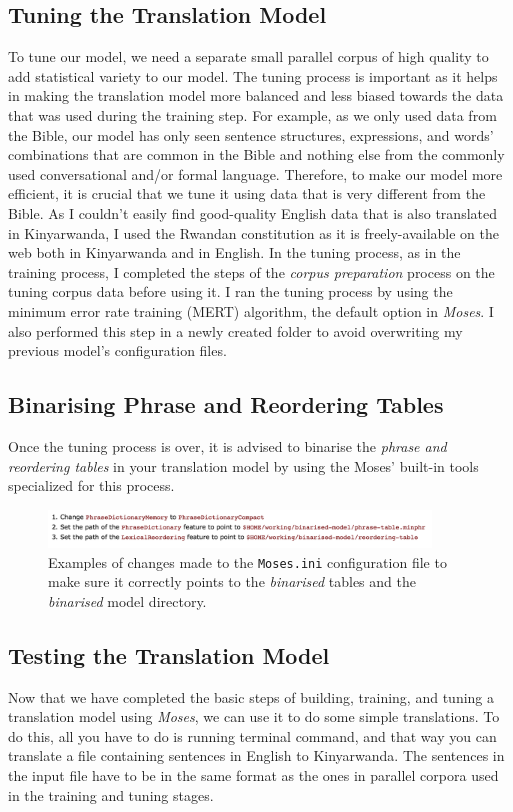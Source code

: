 \subsection{Tuning the Translation Model}
To tune our model, we need a separate small parallel corpus of high quality to add statistical variety to our model. The tuning process is important as it helps in making the translation model more balanced and less biased towards the data that was used during the training step. For example, as we only used data from the Bible, our model has only seen sentence structures, expressions, and words' combinations that are common in the Bible and nothing else from the commonly used conversational and/or formal language. Therefore, to make our model more efficient, it is crucial that we tune it using data that is very different from the Bible. As I couldn't easily find good-quality English data that is also translated in Kinyarwanda, I used the Rwandan constitution as it is freely-available on the web both in Kinyarwanda and in English. In the tuning process, as in the training process, I completed the steps of the \textit{corpus preparation} process on the tuning corpus data before using it. I ran the tuning process by using the minimum error rate training (MERT) algorithm\cite{och2003minimum}, the default option in \textit{Moses}\cite{mosesfactoredtraining}. I also performed this step in a newly created folder to avoid overwriting my previous model's configuration files.


\subsection{Binarising Phrase and Reordering Tables}
Once the tuning process is over, it is advised to binarise the \textit{phrase and reordering tables} in your translation model by using the Moses' built-in tools specialized for this process\cite{mosesbaselinesystem}.
\begin{figure}[h]
\begin{center}
\includegraphics[width=4in]{figures/change-variables}
\caption{Examples of changes made to the \texttt{Moses.ini} configuration file to make sure it correctly points to the \textit{binarised} tables and the \textit{binarised} model directory.}
\end{center}
\end{figure}
\subsection{Testing the Translation Model}
Now that we have completed the basic steps of building, training, and tuning a translation model using \textit{Moses}, we can use it to do some simple translations. To do this, all you have to do is running terminal command, and that way you can translate a file containing sentences in English to Kinyarwanda. The sentences in the input file have to be in the same format as the ones in parallel corpora used in the training and tuning stages.

